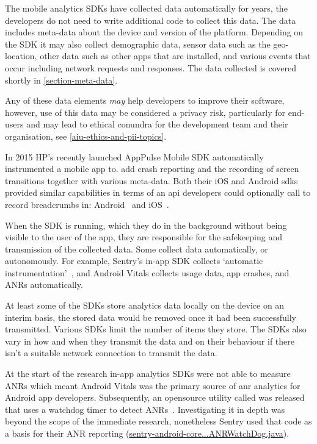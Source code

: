 The mobile analytics SDKs have collected data automatically for years, the developers do not need to write additional code to collect this data. The data includes meta-data about the device and version of the platform. Depending on the SDK it may also collect demographic data, sensor data such as the geo-location, other data such as other apps that are installed, and various events that occur including network requests and responses. The data collected is covered shortly in \ref{section-meta-data}.

Any of these data elements \emph{may} help developers to improve their software, however, use of this data may be considered a privacy risk, particularly for end-users and may lead to ethical conundra for the development team and their organisation, see \ref{aiu-ethics-and-pii-topics}.

In 2015 HP's recently launched AppPulse Mobile SDK automatically instrumented a mobile app to. add crash reporting and the recording of screen transitions together with various meta-data. Both their iOS and Android \Glspl{sdk} provided similar capabilities in terms of an \Gls{api} developers could optionally call to record breadcrumbs in: Android~ and iOS~.

When the SDK is running, which they do in the background without being visible to the user of the app, they are responsible for the safekeeping and transmission of the collected data. Some collect data automatically, or autonomously. For example, Sentry's in-app SDK collects `automatic instrumentation'~, and Android Vitals collects usage data, app crashes, and ANRs automatically.

At least some of the SDKs store analytics data locally on the device on an interim basis, the stored data would be removed once it had been successfully transmitted. Various SDKs limit the number of items they store. The SDKs also vary in how and when they transmit the data and on their behaviour if there isn't a suitable network connection to transmit the data.


At the start of the research in-app analytics SDKs were not able to measure ANRs which meant Android Vitals was the primary source of \Gls{anr} analytics for Android app developers. Subsequently, an opensource utility called  was released that uses a watchdog timer to detect ANRs~. 
Investigating it in depth was beyond the scope of the immediate research, nonetheless Sentry used that code as a basis for their ANR reporting (\href{https://github.com/getsentry/sentry-java/blob/3f8d7b1cc869bb056c9db99b459e43f6c375784a/sentry-android-core/src/main/java/io/sentry/android/core/ANRWatchDog.java}{sentry-android-core...ANRWatchDog.java}). 

